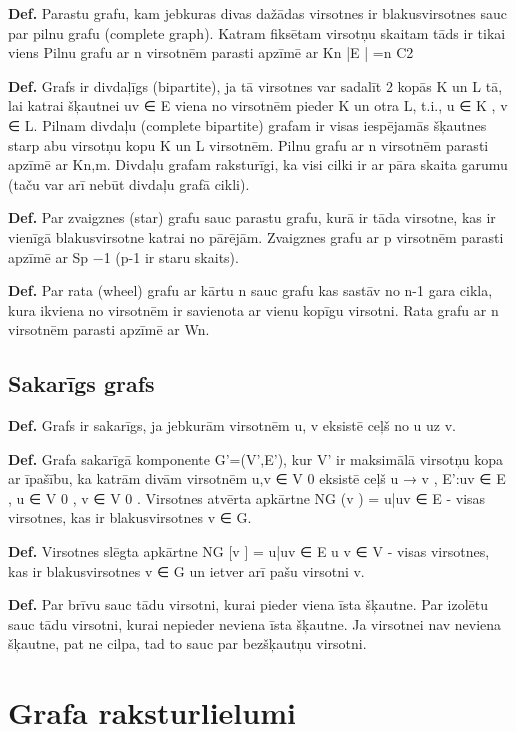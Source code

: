 \documentclass{article}
\begin{document}
\textbf{Def.}  Parastu grafu, kam jebkuras divas dažādas virsotnes ir blakusvirsotnes sauc par pilnu grafu (complete graph).  Katram fiksētam virsotņu skaitam tāds ir tikai viens Pilnu grafu ar n virsotnēm parasti apzīmē ar Kn
|E | =n C2

\textbf{Def.}  Grafs ir divdaļīgs (bipartite), ja tā virsotnes var sadalīt 2 kopās K un L tā, lai katrai šķautnei uv ∈ E viena no virsotnēm pieder K un otra L, t.i., u ∈ K , v ∈ L.  Pilnam divdaļu (complete bipartite) grafam ir visas iespējamās šķautnes starp abu virsotņu kopu K un L virsotnēm.  Pilnu grafu ar n virsotnēm parasti apzīmē ar Kn,m.  Divdaļu grafam raksturīgi, ka visi cilki ir ar pāra skaita garumu (taču var arī nebūt divdaļu grafā cikli).

\textbf{Def.}  Par zvaigznes (star) grafu sauc parastu grafu, kurā ir tāda virsotne, kas ir vienīgā blakusvirsotne katrai no pārējām.  Zvaigznes grafu ar p virsotnēm parasti apzīmē ar Sp −1 (p-1 ir staru skaits).

\textbf{Def.}  Par rata (wheel) grafu ar kārtu n sauc grafu kas sastāv no n-1 gara cikla, kura ikviena no virsotnēm ir savienota ar vienu kopīgu virsotni.  Rata grafu ar n virsotnēm parasti apzīmē ar Wn.

\subsection{Sakarīgs grafs}

\textbf{Def.}  Grafs ir sakarīgs, ja jebkurām virsotnēm u, v eksistē ceļš no u uz v.

\textbf{Def.}  Grafa sakarīgā komponente G'=(V',E'), kur V' ir maksimālā virsotņu kopa ar īpašību, ka katrām divām virsotnēm u,v ∈ V 0 eksistē ceļš u → v , E':uv ∈ E , u ∈ V 0 , v ∈ V 0 .  Virsotnes atvērta apkārtne NG (v ) = {u|uv ∈ E } - visas virsotnes, kas ir blakusvirsotnes v ∈ G.

\textbf{Def.} Virsotnes slēgta apkārtne NG [v ] = {u|uv ∈ E } u {v ∈ V } - visas virsotnes, kas ir
blakusvirsotnes v ∈ G un ietver arī pašu virsotni v.

\textbf{Def.}  Par brīvu sauc tādu virsotni, kurai pieder viena īsta šķautne. Par izolētu sauc tādu virsotni, kurai nepieder neviena īsta šķautne.  Ja virsotnei nav neviena šķautne, pat ne cilpa, tad to sauc par bezšķautņu virsotni.


\section{Grafa raksturlielumi}
\end{document}
